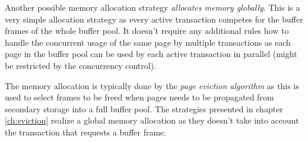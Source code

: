 	Another possible memory allocation strategy \emph{allocates memory globally}. This is a very simple allocation strategy as every active transaction competes for the buffer frames of the whole buffer pool. It doesn't require any additional rules how to handle the concurrent usage of the same page by multiple transactions as each page in the buffer pool can be used by each active transaction in parallel (might be restricted by the concurrency control).
	
	The memory allocation is typically done by the \emph{page eviction algorithm} as this is used to select frames to be freed when pages needs to be propagated from secondary storage into a full buffer pool. The strategies presented in chapter \ref{ch:eviction} realize a global memory allocation as they doesn't take into account the transaction that requests a buffer frame.

